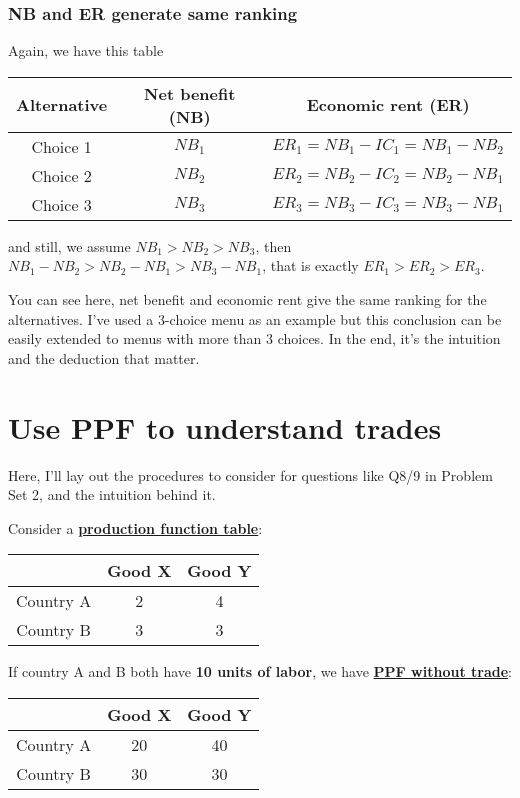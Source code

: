 \documentclass[twoside]{article}
\theoremstyle{definition}
\begin{document}
\subsubsection*{NB and ER generate same ranking}
Again, we have this table
    \begin{table}[h!]
    \centering
        \begin{tabular}{c|c|c}
            Alternative & Net benefit (NB) & Economic rent (ER) \\
            \hline
            Choice 1 & $NB_1$ & $ER_1= NB_1 - IC_1 = NB_1- NB_2$ \\
            Choice 2  & $NB_2$ & $ER_2= NB_2 - IC_2 = NB_2- NB_1$ \\
            Choice 3  & $NB_3$ & $ER_3= NB_3 - IC_3 = NB_3- NB_1$
        \end{tabular}
    \end{table}
    
and still, we assume $NB_1>NB_2>NB_3$, then $NB_1-NB_2 > NB_2 - NB_1 > NB_3 -NB_1$, that is exactly $ER_1 >ER_2 > ER_3$.

You can see here, net benefit and economic rent give the same ranking for the alternatives. I've used a 3-choice menu as an example but this conclusion can be easily extended to menus with more than 3 choices. In the end, it's the intuition and the deduction that matter.

\section{Use PPF to understand trades}
Here, I'll lay out the procedures to consider for questions like Q8/9 in Problem Set 2, and the intuition behind it.

Consider a \textbf{\underline{production function table}}:
\begin{table}[h!]
\centering
    \begin{tabular}{c|cc}
         & Good X & Good Y \\
        \hline
        Country A & 2 & 4 \\
        Country B & 3 & 3
    \end{tabular}
\end{table}

If country A and B both have \textbf{10 units of labor}, we have \underline{\textbf{PPF without trade}}: 

\begin{table}[h!]
\centering
    \begin{tabular}{c|cc}
         & Good X & Good Y \\
        \hline
        Country A & 20 & 40 \\
        Country B & 30 & 30
    \end{tabular}
\end{table}
\end{document}
